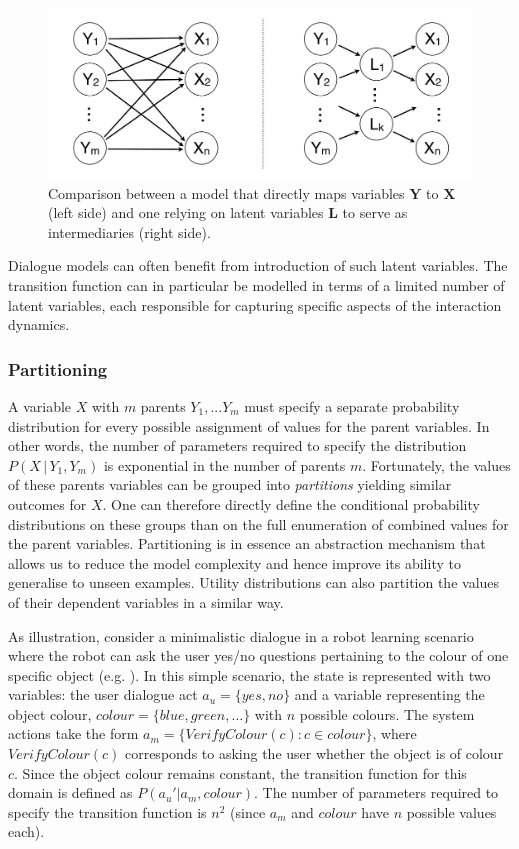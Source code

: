  \begin{figure}[h]
\centering
\includegraphics[scale=0.25]{imgs/latentvariables.pdf}
\caption{Comparison between a model that directly maps variables $\mathbf{Y}$ to $\mathbf{X}$ (left side) and one relying on latent variables $\mathbf{L}$ to serve as intermediaries (right side).}
\label{fig:latentvariables}
\end{figure}

Dialogue models can often benefit from introduction of such latent variables. The transition function can in particular be modelled in terms of a limited number of latent variables, each responsible for capturing specific aspects of the interaction dynamics. 

\subsubsection*{Partitioning}

A variable $X$ with $m$ parents $Y_1,...Y_m$ must specify a separate probability distribution for every possible assignment of values for the parent variables. In other words, the number of parameters required to specify the distribution $P(X \, | \, Y_1, Y_m)$ is exponential in the number of parents $m$. Fortunately, the values of these parents variables can be grouped into \textit{partitions} yielding similar outcomes for $X$. One can therefore directly define the conditional probability distributions on these groups than on the full enumeration of combined values for the parent variables. Partitioning is in essence an abstraction mechanism that allows us to reduce the model complexity and hence improve its ability to generalise to unseen examples. Utility distributions can also partition the values of their dependent variables in a similar way.  

As illustration, consider a minimalistic dialogue in a robot learning scenario where the robot can ask the user yes/no questions pertaining to the colour of one specific object (e.g. ). In this simple scenario, the state is represented with two variables: the user dialogue act $a_u = \{\mathit{yes,no}\}$ and a variable representing the object colour, $\mathit{colour} = \{\mathit{blue,green, ...}\}$ with $n$ possible colours.  The system actions take the form $a_m = \{ \mathit{VerifyColour(c)}: c \in \mathit{colour}\}$, where $VerifyColour(c)$ corresponds to asking the user whether the object is of colour $c$.  Since the object colour remains constant, the transition function for this domain is defined as $P(a_u'|a_m, \mathit{colour})$. The number of parameters required to specify the transition function is $n^2$ (since $a_m$ and $\mathit{colour}$ have $n$ possible values each). 

